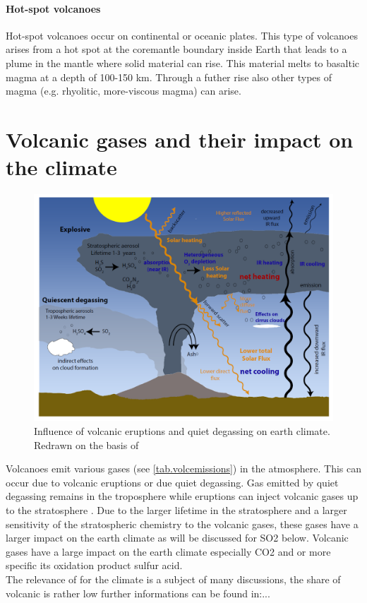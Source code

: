 \documentclass  [
  paper    = a4,
  BCOR     = 10mm,
  twoside,
  fontsize = 12pt,
  fleqn,
  toc      = bibnumbered,
  toc      = listofnumbered,
  numbers  = noendperiod,
  headings = normal,
  listof   = leveldown,
  version  = 3.03
]                                       {scrreprt}
\begin{document}
\paragraph{ Hot-spot volcanoes} Hot-spot volcanoes occur on continental or oceanic plates. This type of volcanoes arises from a hot spot at the coremantle boundary inside Earth that leads to a plume in the mantle where solid material can rise. This material melts to basaltic magma at a depth of 100-150 km. Through a futher rise also other types of magma (e.g. rhyolitic, more-viscous magma) can arise.


\section{Volcanic gases and their impact on the climate}
\begin{figure}
	\centering
	\includegraphics[width=0.7\linewidth]{Bilder/Simon/Bilder_Tung/Climate_Influence}
	\caption{Influence of volcanic eruptions and quiet degassing on earth climate. Redrawn on the basis of \cite{robock2000volcanic}}
	\label{fig:climateinfluence}
\end{figure}
Volcanoes emit various gases (see \cref{tab.volcemissions}) in the atmosphere. This can occur due to volcanic eruptions or due quiet degassing. Gas emitted by quiet degassing remains in the troposphere while eruptions can inject volcanic gases up to the stratosphere \citet{robock2000volcanic}. Due to the larger lifetime in the stratosphere and a larger sensitivity of the stratospheric chemistry to the volcanic gases, these gases have a larger impact on the earth climate as will be discussed for SO2 below.
Volcanic gases have a large impact on the earth climate especially CO2 and   or more specific its oxidation product sulfur acid.\\ 
The relevance of   for the climate is a subject of many discussions, the share of volcanic   is rather low further informations can be found in:...\\\\
\end{document}
